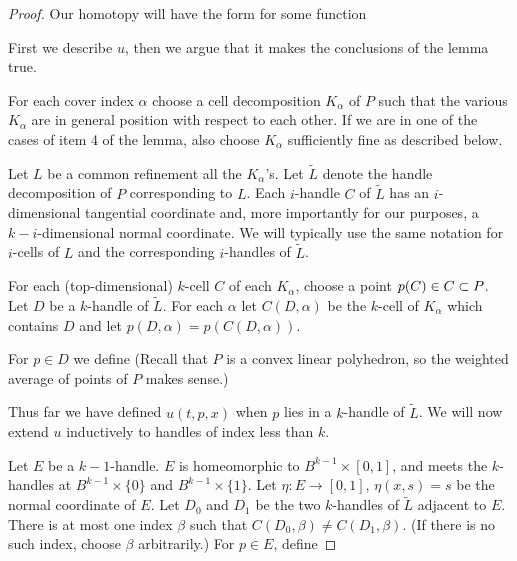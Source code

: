 \begin{proof}
Our homotopy will have the form
for some function

First we describe $u$, then we argue that it makes the conclusions of the lemma true.

For each cover index $\alpha$ choose a cell decomposition $K_\alpha$ of $P$
such that the various $K_\alpha$ are in general position with respect to each other.
If we are in one of the cases of item 4 of the lemma, also choose $K_\alpha$
sufficiently fine as described below.

\def\jj{\tilde{L}}
Let $L$ be a common refinement all the $K_\alpha$'s.
Let $\jj$ denote the handle decomposition of $P$ corresponding to $L$.
Each $i$-handle $C$ of $\jj$ has an $i$-dimensional tangential coordinate and,
more importantly for our purposes, a $k{-}i$-dimensional normal coordinate.
We will typically use the same notation for $i$-cells of $L$ and the 
corresponding $i$-handles of $\jj$.

For each (top-dimensional) $k$-cell $C$ of each $K_\alpha$, choose a point $p(C) \in C \subset P$.
Let $D$ be a $k$-handle of $\jj$.
For each $\alpha$ let $C(D, \alpha)$ be the $k$-cell of $K_\alpha$ which contains $D$
and let $p(D, \alpha) = p(C(D, \alpha))$.

For $p \in D$ we define
(Recall that $P$ is a convex linear polyhedron, so the weighted average of points of $P$
makes sense.)

Thus far we have defined $u(t, p, x)$ when $p$ lies in a $k$-handle of $\jj$.
We will now extend $u$ inductively to handles of index less than $k$.

Let $E$ be a $k{-}1$-handle.
$E$ is homeomorphic to $B^{k-1}\times [0,1]$, and meets
the $k$-handles at $B^{k-1}\times\{0\}$ and $B^{k-1}\times\{1\}$.
Let $\eta : E \to [0,1]$, $\eta(x, s) = s$ be the normal coordinate
of $E$.
Let $D_0$ and $D_1$ be the two $k$-handles of $\jj$ adjacent to $E$.
There is at most one index $\beta$ such that $C(D_0, \beta) \ne C(D_1, \beta)$.
(If there is no such index, choose $\beta$
arbitrarily.)
For $p \in E$, define



\end{proof}
